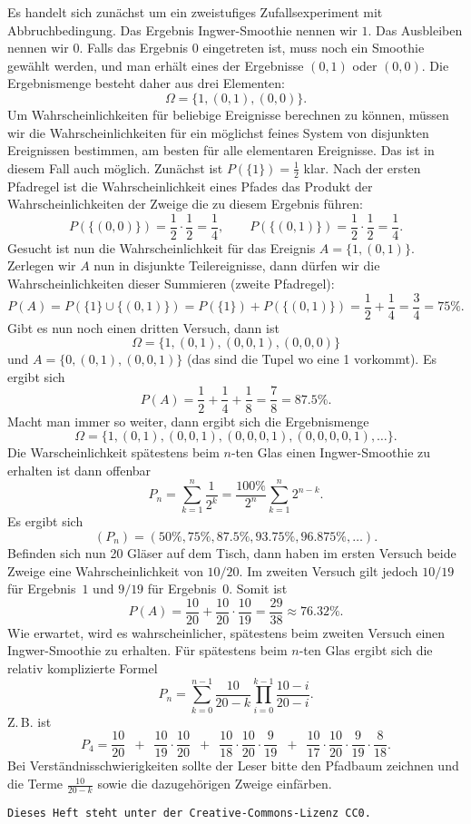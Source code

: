 \documentclass[a4paper,10pt,fleqn,twoside]{scrartcl}
\numberwithin{equation}{section}
\newcommand{\strong}[1]{{\normalfont\sffamily\bfseries #1}}
\theoremstyle{Aufgabe}
\begin{document}
\noindent\strong{Lösung.}
Es handelt sich zunächst um ein zweistufiges Zufallsexperiment
mit Abbruchbedingung. Das Ergebnis Ingwer-Smoothie nennen wir $1$.
Das Ausbleiben nennen wir $0$. Falls das Ergebnis $0$ eingetreten ist,
muss noch ein Smoothie gewählt werden, und man erhält eines der
Ergebnisse $(0,1)$ oder $(0,0)$. Die Ergebnismenge besteht daher
aus drei Elementen:
\[\Omega = \{1,(0,1),(0,0)\}.\]
Um Wahrscheinlichkeiten für beliebige Ereignisse berechnen zu können,
müssen wir die Wahrscheinlichkeiten für ein möglichst feines System
von disjunkten Ereignissen bestimmen, am besten für alle elementaren
Ereignisse. Das ist in diesem Fall auch möglich. Zunächst ist
$P(\{1\})=\frac{1}{2}$ klar. Nach der ersten Pfadregel ist die
Wahrscheinlichkeit eines Pfades das Produkt der
Wahrscheinlichkeiten der Zweige die zu diesem Ergebnis führen:%
\[P(\{(0,0)\}) = \frac{1}{2}\cdot\frac{1}{2} = \frac{1}{4},\qquad
P(\{(0,1)\}) = \frac{1}{2}\cdot\frac{1}{2} = \frac{1}{4}.
\]
Gesucht ist nun die Wahrscheinlichkeit für das Ereignis
$A=\{1,(0,1)\}$. Zerlegen wir $A$ nun in disjunkte Teilereignisse,
dann dürfen wir die Wahrscheinlichkeiten dieser Summieren (zweite
Pfadregel):
\[P(A) = P(\{1\}\cup\{(0,1)\}) = P(\{1\})+P(\{(0,1)\})
= \frac{1}{2}+\frac{1}{4} = \frac{3}{4} = 75\%.\]
Gibt es nun noch einen dritten Versuch, dann ist
\[\Omega = \{1,(0,1),(0,0,1),(0,0,0)\}\]
und $A=\{0,(0,1),(0,0,1)\}$ (das sind die Tupel wo eine 1 vorkommt).
Es ergibt sich
\[P(A) = \frac{1}{2}+\frac{1}{4}+\frac{1}{8} = \frac{7}{8} = 87.5\%.\]
Macht man immer so weiter, dann ergibt sich die Ergebnismenge
\[\Omega = \{1,(0,1),(0,0,1),(0,0,0,1),(0,0,0,0,1),\ldots\}.\]
Die Warscheinlichkeit spätestens beim $n$-ten Glas einen Ingwer-Smoothie
zu erhalten ist dann offenbar
\[P_n = \sum_{k=1}^n \frac{1}{2^k} = \frac{100\%}{2^n}\sum_{k=1}^n 2^{n-k}.\]
Es ergibt sich
\[(P_n) = (50\%,75\%,87.5\%,93.75\%,96.875\%,\ldots).\]
Befinden sich nun 20 Gläser auf dem Tisch, dann haben im ersten
Versuch beide Zweige eine Wahrscheinlichkeit von $10/20$. Im
zweiten Versuch gilt jedoch $10/19$ für Ergebnis~$1$ und $9/19$ für
Ergebnis~$0$. Somit ist
\[P(A) = \frac{10}{20}+\frac{10}{20}\cdot\frac{10}{19}
= \frac{29}{38} \approx 76.32\%.\]
Wie erwartet, wird es wahrscheinlicher, spätestens beim zweiten
Versuch einen Ingwer-Smoothie zu erhalten. Für spätestens beim $n$-ten
Glas ergibt sich die relativ komplizierte Formel
\[P_n = \sum_{k=0}^{n-1} \frac{10}{20-k}\prod_{i=0}^{k-1} \frac{10-i}{20-i}.\]
Z.\,B. ist
\[P_4 = \frac{10}{20}\enspace +\enspace\frac{10}{19}\cdot \frac{10}{20}
\enspace +\enspace\frac{10}{18}\cdot\frac{10}{20}\cdot\frac{9}{19}
\enspace +\enspace\frac{10}{17}\cdot\frac{10}{20}\cdot\frac{9}{19}\cdot\frac{8}{18}.\]
Bei Verständnisschwierigkeiten sollte der Leser bitte den Pfadbaum
zeichnen und die Terme $\frac{10}{20-k}$ sowie die dazugehörigen
Zweige einfärben.

\vfill\noindent
\texttt{Dieses Heft steht unter der Creative-Commons-Lizenz CC0.}
\end{document}

